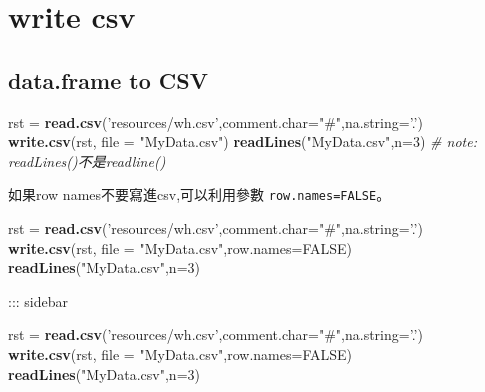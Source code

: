 \documentclass[]{book}
\newenvironment{Shaded}{\begin{snugshade}}{\end{snugshade}}
\newcommand{\KeywordTok}[1]{\textcolor[rgb]{0.13,0.29,0.53}{\textbf{#1}}}
\newcommand{\DataTypeTok}[1]{\textcolor[rgb]{0.13,0.29,0.53}{#1}}
\newcommand{\DecValTok}[1]{\textcolor[rgb]{0.00,0.00,0.81}{#1}}
\newcommand{\StringTok}[1]{\textcolor[rgb]{0.31,0.60,0.02}{#1}}
\newcommand{\CommentTok}[1]{\textcolor[rgb]{0.56,0.35,0.01}{\textit{#1}}}
\newcommand{\OtherTok}[1]{\textcolor[rgb]{0.56,0.35,0.01}{#1}}
\newcommand{\NormalTok}[1]{#1}
\theoremstyle{definition}
\theoremstyle{definition}
\theoremstyle{definition}
\theoremstyle{remark}
\begin{document}
\section{write csv}\label{write-csv}

\subsection{data.frame to CSV}\label{data.frame-to-csv}

\begin{Shaded}
\begin{Highlighting}[]
\NormalTok{rst =}\StringTok{ }\KeywordTok{read.csv}\NormalTok{(}\StringTok{'resources/wh.csv'}\NormalTok{,}\DataTypeTok{comment.char=}\StringTok{"#"}\NormalTok{,}\DataTypeTok{na.string=}\StringTok{'.'}\NormalTok{)}
\KeywordTok{write.csv}\NormalTok{(rst, }\DataTypeTok{file =} \StringTok{"MyData.csv"}\NormalTok{)}
\KeywordTok{readLines}\NormalTok{(}\StringTok{"MyData.csv"}\NormalTok{,}\DataTypeTok{n=}\DecValTok{3}\NormalTok{) }\CommentTok{# note: readLines()不是readline() }
\end{Highlighting}
\end{Shaded}

如果row names不要寫進csv,可以利用參數 \texttt{row.names=FALSE}。

\begin{Shaded}
\begin{Highlighting}[]
\NormalTok{rst =}\StringTok{ }\KeywordTok{read.csv}\NormalTok{(}\StringTok{'resources/wh.csv'}\NormalTok{,}\DataTypeTok{comment.char=}\StringTok{"#"}\NormalTok{,}\DataTypeTok{na.string=}\StringTok{'.'}\NormalTok{)}
\KeywordTok{write.csv}\NormalTok{(rst, }\DataTypeTok{file =} \StringTok{"MyData.csv"}\NormalTok{,}\DataTypeTok{row.names=}\OtherTok{FALSE}\NormalTok{)}
\KeywordTok{readLines}\NormalTok{(}\StringTok{"MyData.csv"}\NormalTok{,}\DataTypeTok{n=}\DecValTok{3}\NormalTok{) }
\end{Highlighting}
\end{Shaded}

::: sidebar

\begin{Shaded}
\begin{Highlighting}[]
\NormalTok{rst =}\StringTok{ }\KeywordTok{read.csv}\NormalTok{(}\StringTok{'resources/wh.csv'}\NormalTok{,}\DataTypeTok{comment.char=}\StringTok{"#"}\NormalTok{,}\DataTypeTok{na.string=}\StringTok{'.'}\NormalTok{)}
\KeywordTok{write.csv}\NormalTok{(rst, }\DataTypeTok{file =} \StringTok{"MyData.csv"}\NormalTok{,}\DataTypeTok{row.names=}\OtherTok{FALSE}\NormalTok{)}
\KeywordTok{readLines}\NormalTok{(}\StringTok{"MyData.csv"}\NormalTok{,}\DataTypeTok{n=}\DecValTok{3}\NormalTok{) }
\end{Highlighting}
\end{Shaded}
\end{document}
